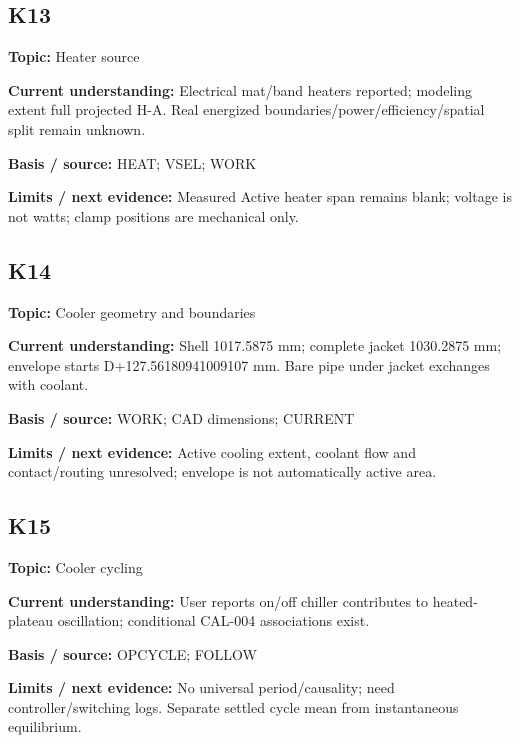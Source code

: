 \documentclass[11pt]{article}
\begin{document}
\par\noindent\begin{minipage}{\textwidth}\small\setlength{\parskip}{2pt}
\subsection*{K13}
\textbf{Topic:} Heater source\par
\textbf{Current understanding:} Electrical mat/band heaters reported; modeling extent full projected H-A. Real energized boundaries/power/efficiency/spatial split remain unknown.\par
\textbf{Basis / source:} HEAT; VSEL; WORK\par
\textbf{Limits / next evidence:} Measured Active heater span remains blank; voltage is not watts; clamp positions are mechanical only.\par
\end{minipage}\par\vspace{5pt}
\par\noindent\begin{minipage}{\textwidth}\small\setlength{\parskip}{2pt}
\subsection*{K14}
\textbf{Topic:} Cooler geometry and boundaries\par
\textbf{Current understanding:} Shell 1017.5875 mm; complete jacket 1030.2875 mm; envelope starts D+127.56180941009107 mm. Bare pipe under jacket exchanges with coolant.\par
\textbf{Basis / source:} WORK; CAD dimensions; CURRENT\par
\textbf{Limits / next evidence:} Active cooling extent, coolant flow and contact/routing unresolved; envelope is not automatically active area.\par
\end{minipage}\par\vspace{5pt}
\par\noindent\begin{minipage}{\textwidth}\small\setlength{\parskip}{2pt}
\subsection*{K15}
\textbf{Topic:} Cooler cycling\par
\textbf{Current understanding:} User reports on/off chiller contributes to heated-plateau oscillation; conditional CAL-004 associations exist.\par
\textbf{Basis / source:} OPCYCLE; FOLLOW\par
\textbf{Limits / next evidence:} No universal period/causality; need controller/switching logs. Separate settled cycle mean from instantaneous equilibrium.\par
\end{minipage}\par\vspace{5pt}
\end{document}
